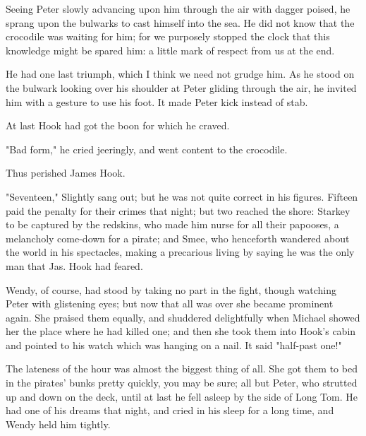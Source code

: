 Seeing Peter slowly advancing upon him through the air with dagger poised,
he sprang upon the bulwarks to cast himself into the sea. He did not know
that the crocodile was waiting for him; for we purposely stopped the clock
that this knowledge might be spared him: a little mark of respect from us
at the end.


He had one last triumph, which I think we need not grudge him. As he stood
on the bulwark looking over his shoulder at Peter gliding through the air,
he invited him with a gesture to use his foot. It made Peter kick instead
of stab.


At last Hook had got the boon for which he craved.


"Bad form," he cried jeeringly, and went content to the crocodile.


Thus perished James Hook.


"Seventeen," Slightly sang out; but he was not quite correct in his
figures. Fifteen paid the penalty for their crimes that night; but two
reached the shore: Starkey to be captured by the redskins, who made him
nurse for all their papooses, a melancholy come-down for a pirate; and
Smee, who henceforth wandered about the world in his spectacles, making a
precarious living by saying he was the only man that Jas. Hook had feared.


Wendy, of course, had stood by taking no part in the fight, though
watching Peter with glistening eyes; but now that all was over she became
prominent again. She praised them equally, and shuddered delightfully when
Michael showed her the place where he had killed one; and then she took
them into Hook's cabin and pointed to his watch which was hanging on a
nail. It said "half-past one!"


The lateness of the hour was almost the biggest thing of all. She got them
to bed in the pirates' bunks pretty quickly, you may be sure; all but
Peter, who strutted up and down on the deck, until at last he fell asleep
by the side of Long Tom. He had one of his dreams that night, and cried in
his sleep for a long time, and Wendy held him tightly.

